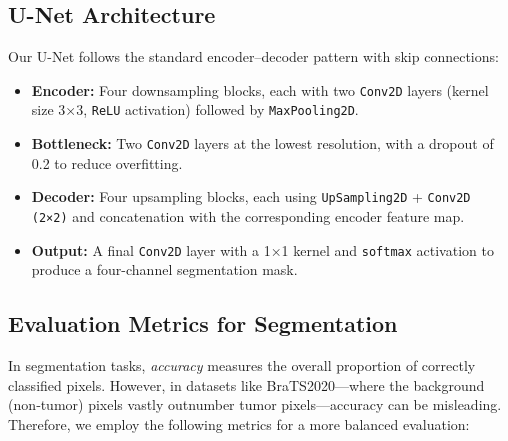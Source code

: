 \subsection{U-Net Architecture}
Our U-Net follows the standard encoder–decoder pattern with skip connections:
\begin{itemize}
  \item \textbf{Encoder:} Four downsampling blocks, each with two \texttt{Conv2D} layers (kernel size 3×3, \texttt{ReLU} activation) followed by \texttt{MaxPooling2D}.
  \item \textbf{Bottleneck:} Two \texttt{Conv2D} layers at the lowest resolution, with a dropout of 0.2 to reduce overfitting.
  \item \textbf{Decoder:} Four upsampling blocks, each using \texttt{UpSampling2D} + \texttt{Conv2D (2×2)} and concatenation with the corresponding encoder feature map.
  \item \textbf{Output:} A final \texttt{Conv2D} layer with a 1×1 kernel and \texttt{softmax} activation to produce a four-channel segmentation mask.
\end{itemize}

\subsection{Evaluation Metrics for Segmentation}
\label{sec:segmentation-metrics}

In segmentation tasks, \emph{accuracy} measures the overall proportion of correctly classified pixels. However, in datasets like BraTS2020—where the background (non‐tumor) pixels vastly outnumber tumor pixels—accuracy can be misleading. Therefore, we employ the following metrics for a more balanced evaluation:

